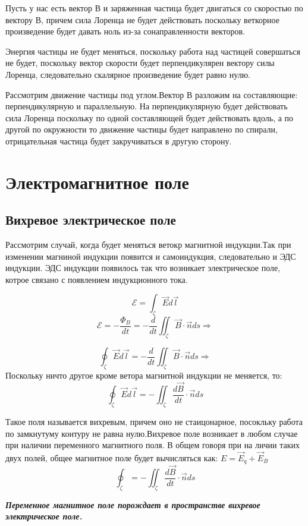 \documentclass[../main.tex]{subfiles}
\begin{document}
Пусть у нас есть вектор В и заряженная частица будет двигаться со скоростью по вектору В, причем сила Лоренца не будет действовать поскольку веткорное произведение будет
 давать ноль из-за сонаправленности векторов.

Энергия частицы не будет меняться, поскольку работа над частицей совершаться не будет, поскольку вектор скорости будет перпендикулярен вектору силы Лоренца, следовательно
скалярное произведение будет равно нулю.

Рассмотрим движение частицы под углом.Вектор В разложим на составляющие: перпендикулярную и параллельную. На перпендикулярную будет действовать сила Лоренца поскольку по одной
составляющей будет действовать вдоль, а по другой по окружности то движение частицы будет направлено по спирали, отрицательная частица будет закручиваться в другую сторону.

\section{Электромагнитное поле}

\subsection{Вихревое электрическое поле}

Рассмотрим случай, когда будет меняться ветокр магнитной индукции.Так при изменении магниной индукции появится и самоиндукция, следовательно и ЭДС индукции.
ЭДС индукции появилось так что возникает электрическое поле, котрое связано с появлением индукционного тока.

\[\mathscr{E} = \int_{\zeta} \vec E d \vec l\]
\[\mathscr{E} = - \frac{\Phi_B}{dt} = -\frac{d}{dt} \iint_{\zeta} \vec B \cdot \vec n ds \Rightarrow\]

\[\oint_{\zeta} \vec E d \vec l = -\frac{d}{dt} \iint_{\zeta} \vec B \cdot \vec n ds \Rightarrow\]
Поскольку ничто другое кроме ветора магнитной индукции не меняется, то:
\[ \oint_{\zeta} \vec E d \vec l = - \iint_{\zeta} \frac{d \vec B}{dt} \cdot \vec n ds\]

Такое поля называется вихревым, причем оно не стаицонарное, посокльку работа по замкнутуму контуру не равна нулю.Вихревое поле возникает в любом случае при наличии переменного магнитного поля.
В общем говоря при на личии таких двух полей, общее магнитное поле будет вычисляться как: $E = \vec E _q + \vec E_B$
\[\oint_{\zeta} = - \iint_{\zeta} \frac{d \vec B}{dt} \cdot \vec n ds\]

\textbf{\textit{Переменное магнитное поле порождает в пространстве вихревое электрическое поле.}}
\end{document}
